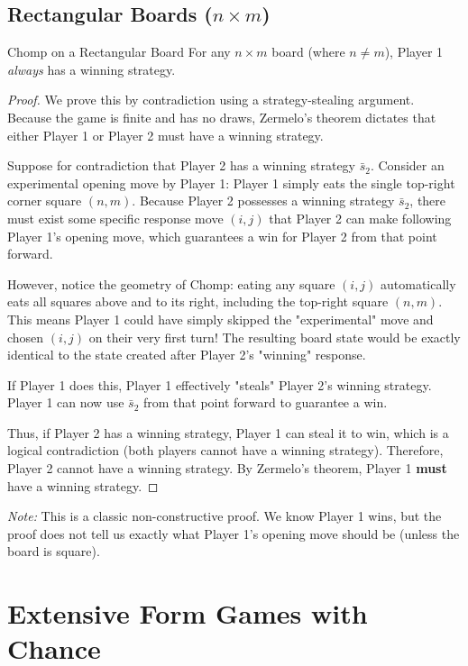 \documentclass[12pt, a4paper]{article}
\begin{document}
\subsection{Rectangular Boards ($n \times m$)}
\begin{thmbox}{Chomp on a Rectangular Board}
  For any $n \times m$ board (where $n \neq m$), Player 1 \textit{always} has a winning strategy.
\end{thmbox}

\begin{proof}
  We prove this by contradiction using a strategy-stealing argument. Because the game is finite and has no draws, Zermelo's theorem dictates that either Player 1 or Player 2 must have a winning strategy.
  
  Suppose for contradiction that Player 2 has a winning strategy $\bar{s}_2$.
  Consider an experimental opening move by Player 1: Player 1 simply eats the single top-right corner square $(n, m)$.
  Because Player 2 possesses a winning strategy $\bar{s}_2$, there must exist some specific response move $(i, j)$ that Player 2 can make following Player 1's opening move, which guarantees a win for Player 2 from that point forward.
  
  However, notice the geometry of Chomp: eating any square $(i, j)$ automatically eats all squares above and to its right, including the top-right square $(n, m)$. 
  This means Player 1 could have simply skipped the "experimental" move and chosen $(i, j)$ on their very first turn! The resulting board state would be exactly identical to the state created after Player 2's "winning" response.
  
  If Player 1 does this, Player 1 effectively "steals" Player 2's winning strategy. Player 1 can now use $\bar{s}_2$ from that point forward to guarantee a win.
  
  Thus, if Player 2 has a winning strategy, Player 1 can steal it to win, which is a logical contradiction (both players cannot have a winning strategy). Therefore, Player 2 cannot have a winning strategy. By Zermelo's theorem, Player 1 \textbf{must} have a winning strategy.
\end{proof}
\textit{Note:} This is a classic non-constructive proof. We know Player 1 wins, but the proof does not tell us exactly what Player 1's opening move should be (unless the board is square).

\section{Extensive Form Games with Chance}
\end{document}
